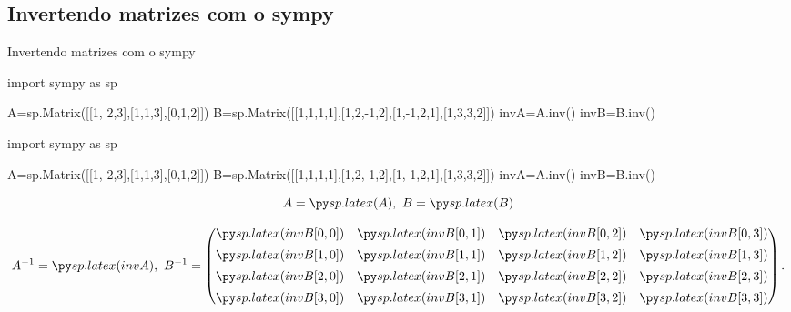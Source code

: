 \subsection*{Invertendo matrizes com o sympy}

\begin{frame}[label=inversao,fragile=singleslide]{Invertendo matrizes com o sympy}
	\begin{footnotesize}
\begin{pyverbatim}
import sympy as sp

A=sp.Matrix([[1, 2,3],[1,1,3],[0,1,2]])
B=sp.Matrix([[1,1,1,1],[1,2,-1,2],[1,-1,2,1],[1,3,3,2]])
invA=A.inv()
invB=B.inv()
\end{pyverbatim}
	\end{footnotesize}		
\begin{pycode}
import sympy as sp

A=sp.Matrix([[1, 2,3],[1,1,3],[0,1,2]])
B=sp.Matrix([[1,1,1,1],[1,2,-1,2],[1,-1,2,1],[1,3,3,2]])
invA=A.inv()
invB=B.inv()
\end{pycode}
\[A=\pyl{A},\ B=\pyl{B}\]

\[A^{-1}=\pyl{invA},\ 
B^{-1}=\begin{pmatrix}
\pyl{invB[0,0]} & \pyl{invB[0,1]} & \pyl{invB[0,2]}  & \pyl{invB[0,3]}  \\[0.5em]
\pyl{invB[1,0]} & \pyl{invB[1,1]} & \pyl{invB[1,2]}  & \pyl{invB[1,3]}  \\[0.5em]
\pyl{invB[2,0]} & \pyl{invB[2,1]} & \pyl{invB[2,2]}  & \pyl{invB[2,3]}  \\[0.5em]
\pyl{invB[3,0]} & \pyl{invB[3,1]} & \pyl{invB[3,2]}  & \pyl{invB[3,3]}  
\end{pmatrix}.\]


\end{frame}